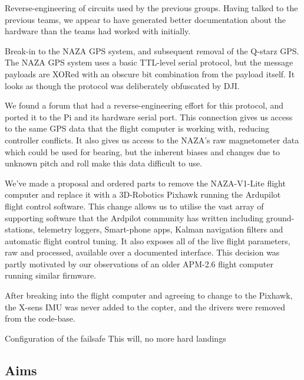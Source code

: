 \documentclass[a4paper, 11pt, titlepage]{article}
\begin{document}
    Reverse-engineering of circuits used by the previous groups. Having talked to the previous teams, we appear to have generated better documentation about the hardware than the teams had worked with initially.

    Break-in to the NAZA GPS system, and subsequent removal of the Q-starz GPS.
    The NAZA GPS system uses a basic TTL-level serial protocol, but the message payloads are XORed with an obscure bit combination from the payload itself.  It looks as though the protocol was deliberately obfuscated by DJI.
    
    We found a forum that had a reverse-engineering effort for this protocol, and ported it to the Pi and its hardware serial port.  This connection gives us access to the same GPS data that the flight computer is working with, reducing controller conflicts. It also gives us access to the NAZA's raw magnetometer data which could be used for bearing, but the inherent biases and changes due to unknown pitch and roll make this data difficult to use.

    We've made a proposal and ordered parts to remove the NAZA-V1-Lite flight computer and replace it with a 3D-Robotics Pixhawk running the Ardupilot flight control software.
    This change allows us to utilise the vast array of supporting software that the Ardpilot community has written including ground-stations, telemetry loggers, Smart-phone apps, Kalman navigation filters and automatic flight control tuning.  It also exposes all of the live flight parameters, raw and processed, available over a documented interface.
    This decision was partly motivated by our observations of an older APM-2.6 flight computer running similar firmware.

    After breaking into the flight computer and agreeing to change to the Pixhawk, the X-sens IMU was never added to the copter, and the drivers were removed from the code-base.

    Configuration of the failsafe
      This will, no more hard landings



  \subsection{Aims}
\end{document}
